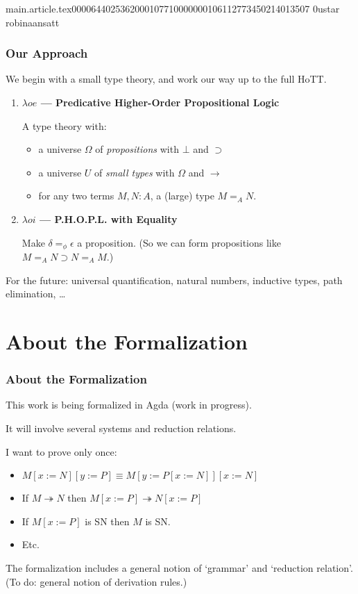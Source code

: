 main.article.tex                                                                                    0000644 0253620 0010771 00000001061 12773450214 013507  0                                                                                                    ustar   robina                          ansatt                                                                                                                                                                                                                 \documentclass{article}
\begin{document}
\begin{frame}
\frametitle{Our Approach}
We begin with a small type theory, and work our way up to the full HoTT. %
\begin{enumerate}
\item \textbf{$\lambda o e$ --- Predicative Higher-Order Propositional Logic}

 A type theory with:
  \begin{itemize}
  \item a universe $\Omega$ of \emph{propositions} with $\bot$ and $\supset$
  \item a universe $U$ of \emph{small types} with $\Omega$ and $\rightarrow$
  \item for any two terms $M, N : A$, a (large) type $M =_A N$.
  \end{itemize}
\item \textbf{$\lambda o i$ --- P.H.O.P.L. with Equality}

Make $\delta =_\phi \epsilon$ a proposition.  (So we can form propositions like $M =_A N \supset N =_A M$.)
\end{enumerate}
For the future: universal quantification, natural numbers, inductive types, path elimination, \ldots
\end{frame}

\section{About the Formalization}

\begin{frame}
\frametitle{About the Formalization}
This work is being formalized in Agda (work in progress).
\pause

It will involve several systems and reduction relations.

I want to prove only once:
\pause
\begin{itemize}[<+->]
\item
$M[x:=N][y:=P] \equiv M[y:=P[x:=N]][x:=N]$
\item
If $M \twoheadrightarrow N$ then $M[x:=P] \twoheadrightarrow N[x:=P]$
\item
If $M[x:=P]$ is SN then $M$ is SN.
\item
Etc.
\end{itemize}
\pause
The formalization includes a general notion of `grammar' and `reduction relation'.  (To do: general notion of derivation rules.)
\end{frame}
\end{document}
